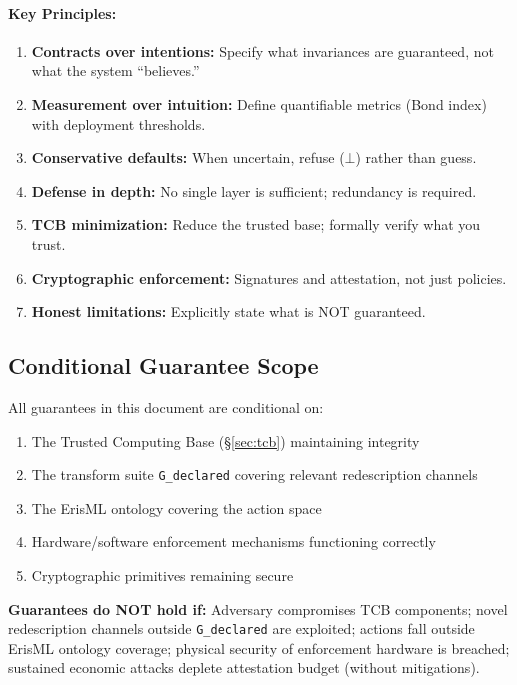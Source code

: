 \documentclass[11pt,letterpaper]{article}
\theoremstyle{definition}
\theoremstyle{remark}
\begin{document}
\paragraph{Key Principles:}
\begin{enumerate}
\item \textbf{Contracts over intentions:} Specify what invariances are guaranteed, not what the system ``believes.''
\item \textbf{Measurement over intuition:} Define quantifiable metrics (Bond index) with deployment thresholds.
\item \textbf{Conservative defaults:} When uncertain, refuse ($\bot$) rather than guess.
\item \textbf{Defense in depth:} No single layer is sufficient; redundancy is required.
\item \textbf{TCB minimization:} Reduce the trusted base; formally verify what you trust.
\item \textbf{Cryptographic enforcement:} Signatures and attestation, not just policies.
\item \textbf{Honest limitations:} Explicitly state what is NOT guaranteed.
\end{enumerate}

\subsection{Conditional Guarantee Scope}

All guarantees in this document are conditional on:
\begin{enumerate}
\item The Trusted Computing Base (\S\ref{sec:tcb}) maintaining integrity
\item The transform suite \texttt{G\_declared} covering relevant redescription channels
\item The ErisML ontology covering the action space
\item Hardware/software enforcement mechanisms functioning correctly
\item Cryptographic primitives remaining secure
\end{enumerate}

\noindent\textbf{Guarantees do NOT hold if:} Adversary compromises TCB components; novel redescription channels outside \texttt{G\_declared} are exploited; actions fall outside ErisML ontology coverage; physical security of enforcement hardware is breached; sustained economic attacks deplete attestation budget (without mitigations).
\end{document}
